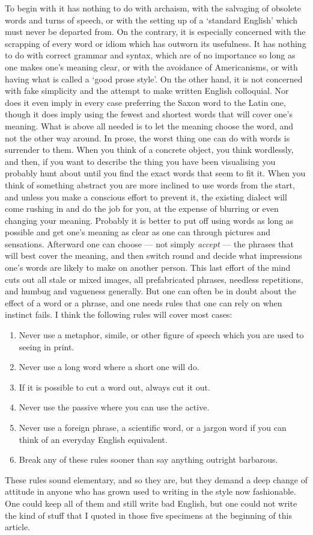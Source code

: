 \documentclass[12pt]{article}
\begin{document}
To begin with it has nothing to do with archaism, with the salvaging of obsolete words and turns of speech, or with the setting up of a `standard English’ which must never be departed from. On the contrary, it is especially concerned with the scrapping of every word or idiom which has outworn its usefulness. It has nothing to do with correct grammar and syntax, which are of no importance so long as one makes one's meaning clear, or with the avoidance of Americanisms, or with having what is called a `good prose style’. On the other hand, it is not concerned with fake simplicity and the attempt to make written English colloquial. Nor does it even imply in every case preferring the Saxon word to the Latin one, though it does imply using the fewest and shortest words that will cover one's meaning. What is above all needed is to let the meaning choose the word, and not the other way around. In prose, the worst thing one can do with words is surrender to them. When you think of a concrete object, you think wordlessly, and then, if you want to describe the thing you have been visualising you probably hunt about until you find the exact words that seem to fit it. When you think of something abstract you are more inclined to use words from the start, and unless you make a conscious effort to prevent it, the existing dialect will come rushing in and do the job for you, at the expense of blurring or even changing your meaning. Probably it is better to put off using words as long as possible and get one's meaning as clear as one can through pictures and sensations. Afterward one can choose — not simply \textit{accept} — the phrases that will best cover the meaning, and then switch round and decide what impressions one's words are likely to make on another person. This last effort of the mind cuts out all stale or mixed images, all prefabricated phrases, needless repetitions, and humbug and vagueness generally. But one can often be in doubt about the effect of a word or a phrase, and one needs rules that one can rely on when instinct fails. I think the following rules will cover most cases:
\begin{enumerate}[label=\roman*]
	\item Never use a metaphor, simile, or other figure of speech which you are used to seeing in print.
	\item Never use a long word where a short one will do.
	\item If it is possible to cut a word out, always cut it out.
	\item Never use the passive where you can use the active.
	\item Never use a foreign phrase, a scientific word, or a jargon word if you can think of an everyday English equivalent.
	\item Break any of these rules sooner than say anything outright barbarous.
\end{enumerate}
These rules sound elementary, and so they are, but they demand a deep change of attitude in anyone who has grown used to writing in the style now fashionable. One could keep all of them and still write bad English, but one could not write the kind of stuff that I quoted in those five specimens at the beginning of this article.
\end{document}
